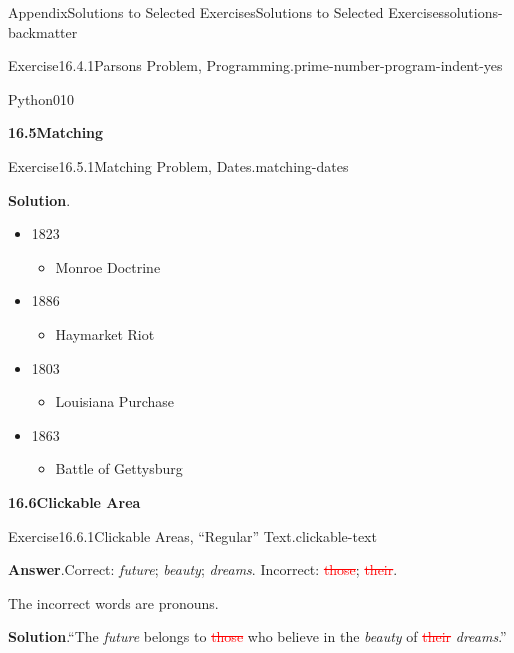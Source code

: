 \documentclass[twoside,10pt,]{article}
\newcommand{\blocktitlefont}{\relax}
\newcommand{\deletethick}{.25ex}
\newcommand{\deleted}[1]{\renewcommand{\ULthickness}{\deletethick}\textcolor{red}{\sout{#1}}}
\numberwithin{equation}{section}
\begin{document}
\begin{solutions-section}{Appendix}{Solutions to Selected Exercises}{}{Solutions to Selected Exercises}{}{}{solutions-backmatter}
\begin{divisionsolution}{Exercise}{16.4.1}{Parsons Problem, Programming.}{prime-number-program-indent-yes}
\begin{program}{Python}{0}{1}{0}
\end{program}
\end{divisionsolution}%
\par\medskip
\noindent\textbf{\large{}16.5\space\textperiodcentered\space{}Matching}
\begin{divisionsolution}{Exercise}{16.5.1}{Matching Problem, Dates.}{matching-dates}%
\par\smallskip%
\noindent\textbf{\blocktitlefont Solution}.\hypertarget{matching-dates-4-back}{}\quad{}%
\begin{itemize}[label=\textbullet]
\item{}1823%
\begin{itemize}[label=$\circ$]
\item{}Monroe Doctrine%
\end{itemize}
%
\item{}1886%
\begin{itemize}[label=$\circ$]
\item{}Haymarket Riot%
\end{itemize}
%
\item{}1803%
\begin{itemize}[label=$\circ$]
\item{}Louisiana Purchase%
\end{itemize}
%
\item{}1863%
\begin{itemize}[label=$\circ$]
\item{}Battle of Gettysburg%
\end{itemize}
%
\end{itemize}
%
\end{divisionsolution}%
\par\medskip
\noindent\textbf{\large{}16.6\space\textperiodcentered\space{}Clickable Area}
\begin{divisionsolution}{Exercise}{16.6.1}{Clickable Areas, ``Regular'' Text.}{clickable-text}%
\par\smallskip%
\noindent\textbf{\blocktitlefont Answer}.\hypertarget{clickable-text-3-back}{}\quad{}Correct: \emph{future}; \emph{beauty}; \emph{dreams}. Incorrect: \deleted{those}; \deleted{their}.%
\par
The incorrect words are pronouns.%
\par\smallskip%
\noindent\textbf{\blocktitlefont Solution}.\hypertarget{clickable-text-4-back}{}\quad{}``The \emph{future} belongs to \deleted{those} who believe in the \emph{beauty} of \deleted{their} \emph{dreams}.''%
\end{divisionsolution}%

\end{solutions-section}
\end{document}
